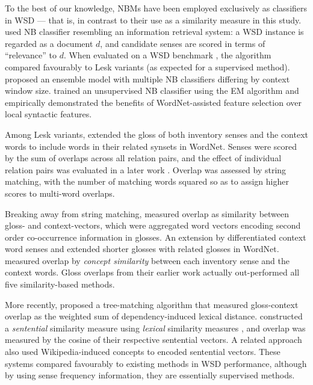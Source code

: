 \documentclass[11pt]{article}
\begin{document}
To the best of our knowledge, NBMs have been employed exclusively as
classifiers in WSD --- that is, in contrast to their use as a
similarity measure in this study. \citet{gale1992method} used NB
classifier resembling an information retrieval system: a WSD instance
is regarded as a document $d$, and candidate senses are scored in
terms of ``relevance'' to $d$. When evaluated on a WSD benchmark
\citep{vasilescu2004evaluating}, the algorithm compared favourably to
Lesk variants (as expected for a supervised
method). \citet{pedersen2000simple} proposed an ensemble model with
multiple NB classifiers differing by context window size.
\citet{hristea2009recent} trained an unsupervised NB classifier using
the EM algorithm and empirically demonstrated the benefits of
WordNet-assisted \citep{fellbaum1998wne} feature selection over local
syntactic features.

Among Lesk variants, \citet{banerjee2002adapted} extended the gloss of
both inventory senses and the context words to include words in their
related synsets in WordNet. Senses were scored by the sum of overlaps
across all relation pairs, and the effect of individual relation pairs
was evaluated in a later work \citep{banerjee2003extended}. Overlap
was assessed by string matching, with the number of matching words
squared so as to assign higher scores to multi-word overlaps.

Breaking away from string matching, \citet{wilks1990providing}
measured overlap as similarity between gloss- and context-vectors,
which were aggregated word vectors encoding second order co-occurrence
information in glosses. An extension by \citet{patwardhan2006using}
differentiated context word senses and extended shorter glosses with
related glosses in WordNet. \citet{patwardhan_using_2003} measured
overlap by \textit{concept similarity}
\citep{budanitsky2006evaluating} between each inventory sense and the
context words. Gloss overlaps from their earlier work actually
out-performed all five similarity-based methods.

More recently, \citet{Chen:2009:FUW:1620754.1620759} proposed a
tree-matching algorithm that measured gloss-context overlap as the
weighted sum of dependency-induced lexical
distance. \citet{Abdalgader:2012:USW:2168748.2168750} constructed a
\textit{sentential} similarity measure \citep{li2006sentence} using
\textit{lexical} similarity measures \citep{budanitsky2006evaluating},
and overlap was measured by the cosine of their respective sentential
vectors. A related approach \citep{raviv2012concept} also used
Wikipedia-induced concepts to encoded sentential vectors. These
systems compared favourably to existing methods in WSD performance,
although by using sense frequency information, they are essentially
supervised methods.
\end{document}
